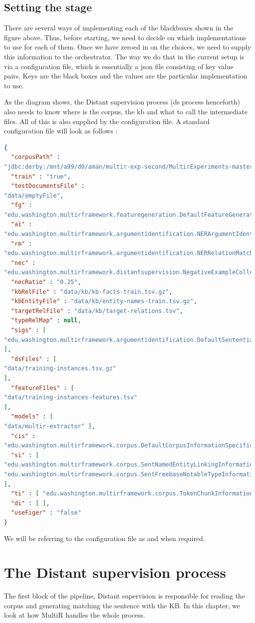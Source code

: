 \documentclass[a4paper,10pt]{report}
\begin{document}
\section{Setting the stage}
There are several ways of implementing each of the blackboxes shown in the figure above. Thus, before starting, we need to decide on which implementations to use for each of them.
Once we have zeroed in on the choices, we need to supply this information to the orchestrator. The way we do that in the current setup is via a configuration file, which is essentially
a json file consisting of key value pairs. Keys are the black boxes and the values are the particular implementation to use. 

As the diagram shows, the Distant supervision process (ds process henceforth) also needs to know where is the corpus, the kb and what to call the intermediate files. 
All of this is also supplied by the configuration file. A standard configuration file will look as follows : 
\begin{lstlisting}[language=json,firstnumber=1]
{
  "corpusPath" :
"jdbc:derby:/mnt/a99/d0/aman/multir-exp-second/MultirExperiments-master/data/FullCorpus-First100Sentences",
  "train" : "true",
  "testDocumentsFile" :
"data/emptyFile",
  "fg" :
"edu.washington.multirframework.featuregeneration.DefaultFeatureGenerator",
  "ai" :
"edu.washington.multirframework.argumentidentification.NERArgumentIdentification",
  "rm" :
"edu.washington.multirframework.argumentidentification.NERRelationMatching",
  "nec" :
"edu.washington.multirframework.distantsupervision.NegativeExampleCollectionByRatio",
  "necRatio" : "0.25",
  "kbRelFile" : "data/kb/kb-facts-train.tsv.gz",
  "kbEntityFile" : "data/kb/entity-names-train.tsv.gz",
  "targetRelFile" : "data/kb/target-relations.tsv",
  "typeRelMap" : null,
  "sigs" : [
"edu.washington.multirframework.argumentidentification.DefaultSententialInstanceGeneration"
],
  "dsFiles" : [
"data/training-instances.tsv.gz"
],
  "featureFiles" : [
"data/training-instances-features.tsv"
],
  "models" : [
"data/multir-extractor" ],
  "cis" :
"edu.washington.multirframework.corpus.DefaultCorpusInformationSpecification",
  "si" : [
"edu.washington.multirframework.corpus.SentNamedEntityLinkingInformation",
"edu.washington.multirframework.corpus.SentFreebaseNotableTypeInformation"
],
  "ti" : [ "edu.washington.multirframework.corpus.TokenChunkInformation" ],
  "di" : [ ],
  "useFiger" : "false"
}
\end{lstlisting}
We will be referring to the configuration file as and when required.
\chapter{The Distant supervision process}
The first block of the pipeline, Distant supervision is responsible for reading the corpus and generating matching the sentence with the KB.
In this chapter, we look at how MultiR handles the whole process.
\end{document}

